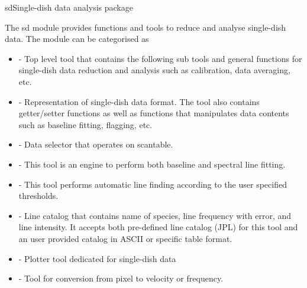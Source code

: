 \begin{ahmodule}{sd}{Single-dish data analysis package}

\begin{ahdescription}

The sd module provides functions and tools to reduce and analyse 
single-dish data. 
The module can be categorised as 

\begin{itemize}

\item {} - Top level tool that contains the following sub 
tools and general functions for single-dish data reduction 
and analysis such as calibration, data averaging, etc. 

\item {} - Representation of single-dish data 
format. The tool also contains getter/setter functions as well as functions 
that manipulates data contents such as baseline fitting, flagging, etc. 

\item {} - Data selector that operates on 
scantable.

\item {} - This tool is an engine to perform both 
baseline and spectral line fitting.

\item {} - This tool performs automatic 
line finding according to the user specified thresholds.

\item {} - Line catalog that contains name of species, 
line frequency with error, and line intensity. 
It accepts both pre-defined line catalog (JPL) for this tool and an user provided 
catalog in ASCII or specific table format.

\item {} - Plotter tool dedicated for 
single-dish data


\item {} - Tool for conversion from pixel to 
velocity or frequency.



\end{itemize}
\end{ahdescription}
\end{ahmodule}

